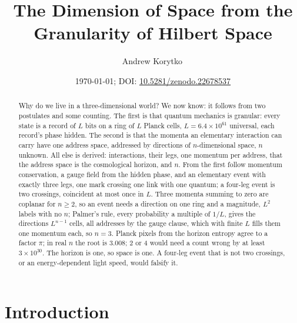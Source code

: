 \documentclass[aps,prd,twocolumn,superscriptaddress,nofootinbib]{revtex4-2}
\begin{document}
\title{The Dimension of Space from the Granularity of Hilbert Space}

\author{Andrew Korytko\,}

\date{\today; DOI: \href{https://doi.org/10.5281/zenodo.22678537}{10.5281/zenodo.22678537}}

\begin{abstract}
Why do we live in a three-dimensional world? We now know: it follows from two postulates and some counting. The first is that quantum mechanics is granular: every state is a record of $L$ bits on a ring of $L$ Planck cells, $L = 6.4\times10^{61}$ universal, each record's phase hidden. The second is that the momenta an elementary interaction can carry have one address space, addressed by directions of $n$-dimensional space, $n$ unknown. All else is derived: interactions, their legs, one momentum per address, that the address space is the cosmological horizon, and $n$. From the first follow momentum conservation, a gauge field from the hidden phase, and an elementary event with exactly three legs, one mark crossing one link with one quantum; a four-leg event is two crossings, coincident at most once in $L$. Three momenta summing to zero are coplanar for $n \ge 2$, so an event needs a direction on one ring and a magnitude, $L^2$ labels with no $n$; Palmer's rule, every probability a multiple of $1/L$, gives the directions $L^{n-1}$ cells, all addresses by the gauge clause, which with finite $L$ fills them one momentum each, so $n = 3$. Planck pixels from the horizon entropy agree to a factor $\pi$; in real $n$ the root is $3.008$; 2 or 4 would need a count wrong by at least $3\times10^{30}$. The horizon is one, so space is one. A four-leg event that is not two crossings, or an energy-dependent light speed, would falsify it.
\end{abstract}


\maketitle

\section{Introduction}
\label{sec:intro}
\end{document}

